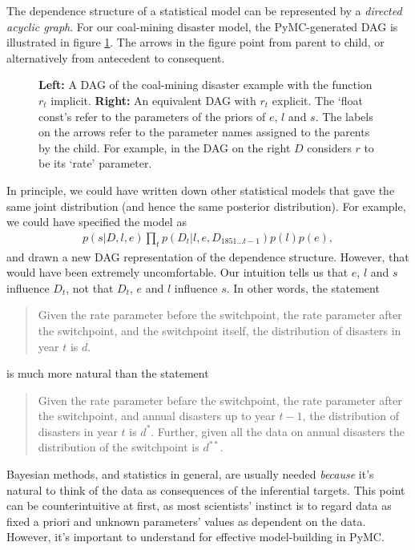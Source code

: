 \documentclass[]{book}
\begin{document}
The dependence structure of a statistical model can be represented by a \emph{directed acyclic graph}. For our coal-mining disaster model, the PyMC-generated DAG is illustrated in figure \ref{fig:disaster_dag}. The arrows in the figure point from parent to child, or alternatively from antecedent to consequent.

\begin{figure}[hhhhhhhhhhh]
\begin{center}
\caption{\textbf{Left:} A DAG of the coal-mining disaster example with the function $r_t$ implicit. \textbf{Right:} An equivalent DAG with $r_t$ explicit. The `float const's refer to the parameters of the priors of $e$, $l$ and $s$. The labels on the arrows refer to the parameter names assigned to the parents by the child. For example, in the DAG on the right $D$ considers $r$ to be its `rate' parameter.
}
\label{fig:disaster_dag}
\end{center}
\end{figure}

In principle, we could have written down other statistical models that gave the same joint distribution (and hence the same posterior distribution). For example, we could have specified the model as
\begin{eqnarray*}
p(s|D,l,e)\prod_tp(D_t|l,e,D_{1851\ldots t-1})p(l)p(e),
\end{eqnarray*}
and drawn a new DAG representation of the dependence structure. However, that would have been extremely uncomfortable. Our intuition tells us that $e$, $l$ and $s$ influence $D_t$, not that $D_t$, $e$ and $l$ influence $s$. In other words, the statement
\begin{quote}
Given the rate parameter before the switchpoint, the rate parameter after the switchpoint, and the switchpoint itself, the distribution of disasters in year $t$ is $d$.
\end{quote}
is much more natural than the statement
\begin{quote}
Given the rate parameter befare the switchpoint, the rate parameter after the switchpoint, and annual disasters up to year $t-1$, the distribution of disasters in year $t$ is $d^*$. Further, given all the data on annual disasters the distribution of the switchpoint is $d^{**}$.
\end{quote}

Bayesian methods, and statistics in general, are usually needed \emph{because} it's natural to think of the data as consequences of the inferential targets. This point can be counterintuitive at first, as most scientists' instinct is to regard data as fixed a priori and unknown parameters' values as dependent on the data. However, it's important to understand for effective model-building in PyMC.
\end{document}
